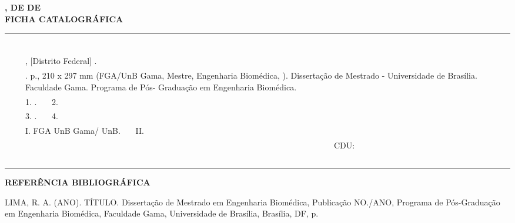 \begin{fichacatalografica}
\begin{flushleft}
    \textbf{\imprimirlocal, \imprimirdia DE \imprimirmes DE \imprimirdata} \\
       	    \vspace{0.25 in}
	\textbf{FICHA CATALOGRÁFICA}\\
	\begin{tabular}{c|p{}p{13.5cm}|}
	\multicolumn{3}{l}{~~~ } \\ \cline{2-3} 
	& & \\
	& & \imprimirautor \\
	& & \imprimirtitulo, [Distrito Federal] \imprimirdata.\\
	& & \imprimirpublicacao. \pageref{LastPage} p., 210 x 297 mm (FGA/UnB Gama, Mestre, Engenharia Biomédica, \imprimirdata).
	Dissertação de Mestrado - Universidade de Brasília. 
	Faculdade Gama. Programa de Pós- Graduação em Engenharia Biomédica.\\
	& & 1. \imprimirpalavrachaveum. ~~~2. \imprimirpalavrachavedois \\
	& & 3. \imprimirpalavrachavetres. ~~~4. \imprimirpalavrachavequatro \\
	& & I. FGA UnB Gama/ UnB. ~~~II.\imprimirtitulo \\
	& & ~~~~~~~~~~~~~~~~~~~~~~~~~~~~~~~~~~~~~~~~~~~~~~~~~~~~~~~~~~~~~~~~~~~~~~~~~~~CDU: \nomecdu \\ \cline{2-3}
	\multicolumn{3}{l}{~~~ } \\
	\end{tabular}
\end{flushleft}
	
\end{fichacatalografica}


\begin{flushleft}
\textbf{REFERÊNCIA BIBLIOGRÁFICA}\\
\end{flushleft}
LIMA, R. A. (ANO). TÍTULO. Dissertação de Mestrado em Engenharia
Biomédica, Publicação NO./ANO, Programa de Pós-Graduação em Engenharia
Biomédica, Faculdade Gama, Universidade de Brasília, Brasília, DF, \pageref{LastPage} p.

